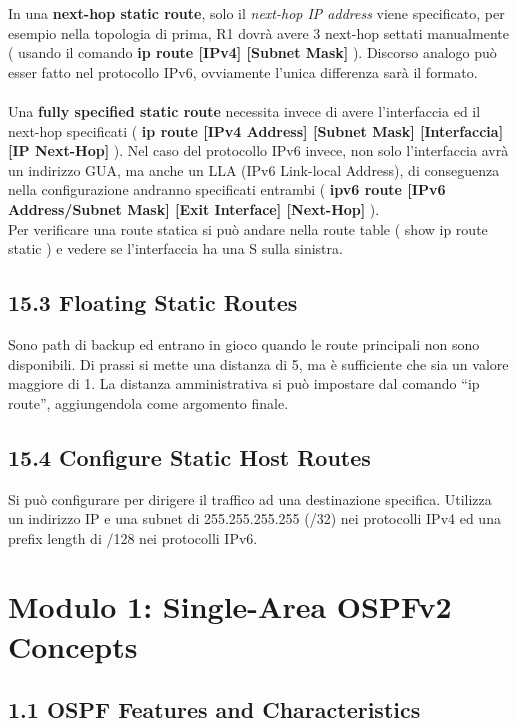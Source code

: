 \documentclass[12pt, a4paper]{article}
\begin{document}
	In una \textbf{next-hop static route}, solo il \textit{next-hop IP address} viene specificato, per esempio nella topologia di prima, R1 dovrà avere 3 next-hop settati manualmente ( usando il comando \textbf{ip route [IPv4] [Subnet Mask]} ). Discorso analogo può esser fatto nel protocollo IPv6, ovviamente l'unica differenza sarà il formato. \\
	\\
	Una \textbf{fully specified static route} necessita invece di avere l'interfaccia ed il next-hop specificati ( \textbf{ip route [IPv4 Address] [Subnet Mask] [Interfaccia] [IP Next-Hop]} ). Nel caso del protocollo IPv6 invece, non solo l'interfaccia avrà un indirizzo GUA, ma anche un LLA (IPv6 Link-local Address), di conseguenza nella configurazione andranno specificati entrambi ( \textbf{ipv6 route [IPv6 Address/Subnet Mask] [Exit Interface] [Next-Hop]} ). \\
	Per verificare una route statica si può andare nella route table ( show ip route static ) e vedere se l'interfaccia ha una S sulla sinistra.
	
	
	\subsection*{15.3 Floating Static Routes}
	
	Sono path di backup ed entrano in gioco quando le route principali non sono disponibili. Di prassi si mette una distanza di 5, ma è sufficiente che sia un valore maggiore di 1. La distanza amministrativa si può impostare dal comando ``ip route'', aggiungendola come argomento finale.
	
	
	\subsection*{15.4 Configure Static Host Routes}
	
	Si può configurare per dirigere il traffico ad una destinazione specifica. Utilizza un indirizzo IP e una subnet di 255.255.255.255 (/32) nei protocolli IPv4 ed una prefix length di /128 nei protocolli IPv6.
	
	
	
	\section*{Modulo 1: Single-Area OSPFv2 Concepts}
	
	\subsection*{1.1 OSPF Features and Characteristics}
	
\end{document}
